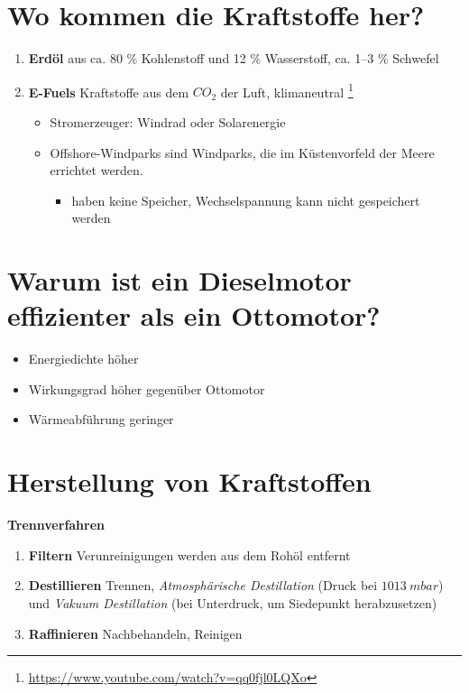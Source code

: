 \section{Wo kommen die Kraftstoffe
her?}\label{wo-kommen-die-kraftstoffe-her}

\begin{enumerate}
\item
  \textbf{Erdöl} aus ca. 80 \% Kohlenstoff und 12 \% Wasserstoff, ca.
  1--3 \% Schwefel
\item
  \textbf{E-Fuels} Kraftstoffe aus dem $CO_2$ der Luft, klimaneutral
  \footnote{\url{https://www.youtube.com/watch?v=qq0fjl0LQXo}}

  \begin{itemize}
  \item
    Stromerzeuger: Windrad oder Solarenergie
  \item
    Offshore-Windparks sind Windparks, die im Küstenvorfeld der Meere
    errichtet werden.

    \begin{itemize}
    \item
      haben keine Speicher, Wechselspannung kann nicht gespeichert
      werden
    \end{itemize}
  \end{itemize}
\end{enumerate}

\section{Warum ist ein Dieselmotor effizienter als ein
Ottomotor?}\label{warum-ist-ein-dieselmotor-effizienter-als-ein-ottomotor}

\begin{itemize}
\item
  Energiedichte höher
\item
  Wirkungsgrad höher gegenüber Ottomotor
\item
  Wärmeabführung geringer
\end{itemize}

\section{Herstellung von
Kraftstoffen}\label{herstellung-von-kraftstoffen}

\textbf{Trennverfahren}

\begin{enumerate}
\item
  \textbf{Filtern} Verunreinigungen werden aus dem Rohöl entfernt
\item
  \textbf{Destillieren} Trennen, \emph{Atmosphärische Destillation}
  (Druck bei $1013~mbar$) und \emph{Vakuum Destillation} (bei
  Unterdruck, um Siedepunkt herabzusetzen)
\item
  \textbf{Raffinieren} Nachbehandeln, Reinigen
\end{enumerate}

